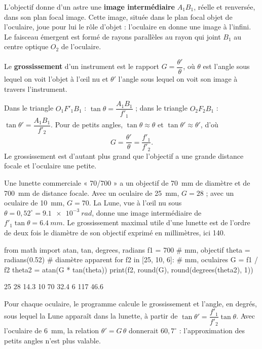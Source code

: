 \begin{propriete}
L'objectif donne d'un astre une \textbf{image intermédiaire} $A_1B_1$, réelle et renversée, dans son plan focal image.
Cette image, située dans le plan focal objet de l'oculaire, joue pour lui le rôle d'objet : l'oculaire en donne une
image à l'infini. Le faisceau émergent est formé de rayons parallèles au rayon qui joint $B_1$ au centre optique $O_2$ de
l'oculaire.
\end{propriete}
\begin{definition}[Grossissement]
Le \textbf{grossissement} d'un instrument est le rapport $G=\dfrac{\theta'}{\theta}$, où $\theta$ est l'angle sous lequel on voit
l'objet à l'œil nu et $\theta'$ l'angle sous lequel on voit son image à travers l'instrument.
\end{definition}
\begin{savoirfaire}
Dans le triangle $O_1F'_1B_1$ : $\tan\theta=\dfrac{A_1B_1}{f'_1}$ ; dans le triangle $O_2F_2B_1$ : $\tan\theta'=\dfrac{A_1B_1}{f'_2}$. Pour de
petits angles, $\tan\theta\approx\theta$ et $\tan\theta'\approx\theta'$, d'où
\[G=\frac{\theta'}{\theta}=\frac{f'_1}{f'_2}.\]
Le grossissement est d'autant plus grand que l'objectif a une grande distance focale et l'oculaire une petite.
\end{savoirfaire}
\begin{exemple}
Une lunette commerciale « 70/700 » a un objectif de \qty{70}{mm} de diamètre et de \qty{700}{mm} de distance focale. Avec un
oculaire de \qty{25}{mm}, $G=28$ ; avec un oculaire de \qty{10}{mm}, $G=70$. La Lune, vue à l'œil nu sous
$\theta=0{,}52^\circ=\qty{9,1e-3}{rad}$, donne une image intermédiaire de $f'_1\tan\theta=\qty{6,4}{mm}$. Le grossissement maximal
utile d'une lunette est de l'ordre de deux fois le diamètre de son objectif exprimé en millimètres, ici 140.
\end{exemple}
\begin{codecote}[0.65]
\begin{pythoncol}
from math import atan, tan, degrees, radians
f1 = 700                      # mm, objectif
theta = radians(0.52)         # diamètre apparent
for f2 in [25, 10, 6]:        # mm, oculaires
    G = f1 / f2
    theta2 = atan(G * tan(theta))
    print(f2, round(G), round(degrees(theta2), 1))
\end{pythoncol}
\begin{consolecol}
25 28 14.3
10 70 32.4
6 117 46.6
\end{consolecol}
\cote
\fontsize{9.5}{12.5}\selectfont
{}\par\smallskip
Pour chaque oculaire, le programme calcule le grossissement et l'angle, en degrés, sous lequel la Lune apparaît dans la
lunette, à partir de $\tan\theta'=\dfrac{f'_1}{f'_2}\tan\theta$. Avec l'oculaire de \qty{6}{mm}, la relation $\theta'=G\,\theta$ donnerait
$60{,}7^\circ$ : l'approximation des petits angles n'est plus valable.
\end{codecote}
